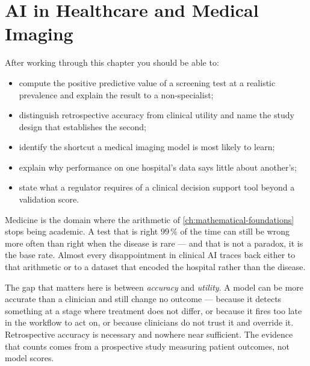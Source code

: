 
\chapter{AI in Healthcare and Medical Imaging}


\label{ch:healthcare}

\begin{learningobjectives}
After working through this chapter you should be able to:
\begin{itemize}
  \item compute the positive predictive value of a screening test at a
        realistic prevalence and explain the result to a non-specialist;
  \item distinguish retrospective accuracy from clinical utility and name the
        study design that establishes the second;
  \item identify the shortcut a medical imaging model is most likely to learn;
  \item explain why performance on one hospital's data says little about
        another's;
  \item state what a regulator requires of a clinical decision support tool
        beyond a validation score.
\end{itemize}
\end{learningobjectives}

\begin{plainlanguage}
Medicine is the domain where the arithmetic of \cref{ch:mathematical-foundations}
stops being academic. A test that is right $99\,\%$ of the time can still be
wrong more often than right when the disease is rare --- and that is not a
paradox, it is the base rate. Almost every disappointment in clinical AI traces
back either to that arithmetic or to a dataset that encoded the hospital rather
than the disease.
\end{plainlanguage}

\begin{engineernote}
The gap that matters here is between \emph{accuracy} and \emph{utility}. A model
can be more accurate than a clinician and still change no outcome --- because it
detects something at a stage where treatment does not differ, or because it
fires too late in the workflow to act on, or because clinicians do not trust it
and override it. Retrospective accuracy is necessary and nowhere near
sufficient. The evidence that counts comes from a prospective study measuring
patient outcomes, not model scores.
\end{engineernote}

